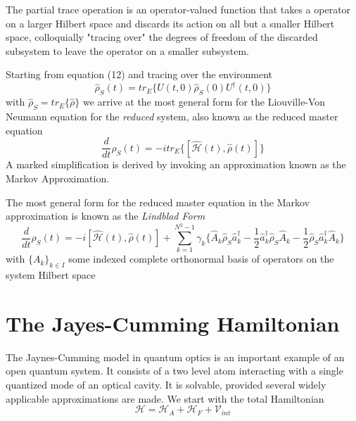 \documentclass[reqno]{amsart}
\newcommand{\ham}{\hat{\mathscr{H}}}
\newcommand{\cre}{\hat{a}^\dagger}
\newcommand{\dens}{\hat{\rho}}
\begin{document}
The partial trace operation is an operator-valued function that takes a operator on a larger Hilbert space and discards its action on all but a smaller Hilbert space, colloquially "tracing over" the degrees of freedom of the discarded subsystem to leave the operator on a smaller subsystem.

Starting from equation (12) and tracing over the environment
\begin{equation}
	\dens_S (t) = tr_E \{U(t, 0) \dens_S (0) U^\dagger (t, 0) \}
\end{equation}
with $\dens_S = tr_E\{\dens\}$ we arrive at the most general form for the Liouville-Von Neumann equation for the \emph{reduced} system, also known as the reduced master equation
\begin{equation}
	\frac{d}{dt} \rho_S (t) = -itr_E\{[\ham(t), \dens(t)]\}
\end{equation}
A marked simplification is derived by invoking an approximation known as the Markov Approximation. 

The most general form\autocite[119--122]{Breuer2002} for the reduced master equation in the Markov approximation is known as the \emph{Lindblad Form}
\begin{equation}
	\frac{d}{dt} \rho_S (t) = -i[\ham (t), \dens (t)] + \sum_{k=1}^{N^2-1} \gamma_k \{ \hat{A}_k \dens_S \cre_k -\frac{1}{2}  \cre_k \dens_S \hat{A}_k -\frac{1}{2} \dens_S \cre_k \hat{A}_k \}
\end{equation} 
with $\{A_k\}_{k \in I}$ some indexed complete orthonormal basis of operators on the system Hilbert space

\section{The Jayes-Cumming Hamiltonian}
The Jaynes-Cumming model in quantum optics is an important example of an open quantum system. It consists of a two level atom interacting with a single quantized mode of an optical cavity. It is solvable, provided several widely applicable approximations are made. 
We start with the total Hamiltonian
\begin{equation}
	\mathscr{H} = \mathscr{H}_A + \mathscr{H}_F +\mathscr{V}_{int}
\end{equation}
\end{document}
